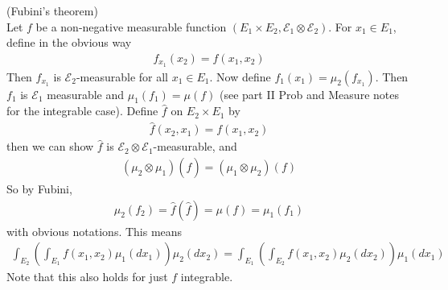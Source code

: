 \documentclass[a4paper]{article}
\begin{document}
\begin{thm} (Fubini's theorem)\\
Let $f$ be a non-negative measurable function $(E_1 \times E_2, \mathcal{E}_1 \otimes \mathcal{E}_2)$. For $x_1 \in E_1$, define in the obvious way
\begin{equation*}
\begin{aligned}
f_{x_1}(x_2) = f(x_1,x_2)
\end{aligned}
\end{equation*}
Then $f_{x_1}$ is $\mathcal{E}_2$-measurable for all $x_1 \in E_1$. Now define $f_1(x_1) = \mu_2(f_{x_1})$. Then $f_1$ is $\mathcal{E}_1$ measurable and $\mu_1(f_1) = \mu(f)$ (see part II Prob and Measure notes for the integrable case). Define $\hat{f}$ on $E_2 \times E_1$ by 
\begin{equation*}
\begin{aligned}
\hat{f}(x_2,x_1) = f(x_1,x_2)
\end{aligned}
\end{equation*}
then we can show $\hat{f}$ is $\mathcal{E}_2 \otimes \mathcal{E}_1$-measurable, and 
\begin{equation*}
\begin{aligned}
(\mu_2 \otimes \mu_1) (\hat{f}) = (\mu_1 \otimes \mu_2) (f)
\end{aligned}
\end{equation*}
So by Fubini,
\begin{equation*}
\begin{aligned}
\mu_2(f_2) = \hat{f}(\hat{f}) = \mu(f) = \mu_1(f_1)
\end{aligned}
\end{equation*}
with obvious notations. This means
\begin{equation*}
\begin{aligned}
\int_{E_2}\left(\int_{E_1} f(x_1,x_2) \mu_1 (dx_1) \right) \mu_2 (dx_2) = \int_{E_1} \left(\int_{E_2} f(x_1,x_2) \mu_2(dx_2) \right) \mu_1(dx_1)
\end{aligned}
\end{equation*}
Note that this also holds for just $f$ integrable.
\end{thm}
\end{document}

